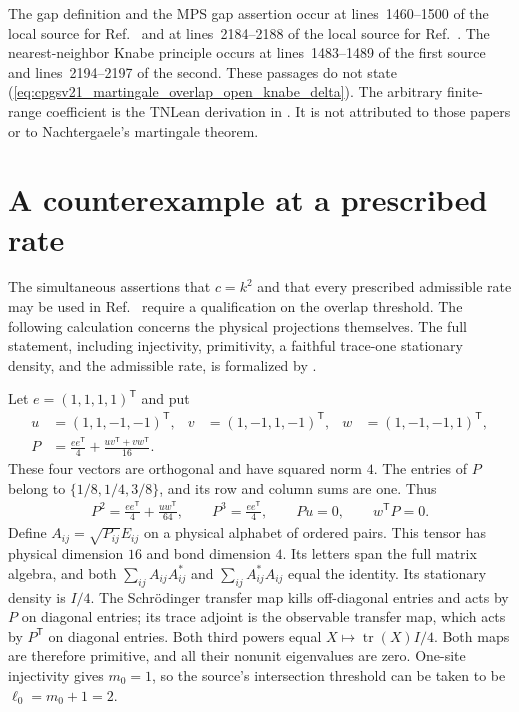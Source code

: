 \documentclass{article}
\begin{document}
The gap definition and the MPS gap assertion occur at lines~1460--1500 of the
local source for Ref.~\cite{PerezGarcia2007Matrix} and at lines~2184--2188 of
the local source for Ref.~\cite{Cirac2021Matrix}.  The nearest-neighbor Knabe
principle occurs at lines~1483--1489 of the first source and
lines~2194--2197 of the second.  These passages do not state
(\ref{eq:cpgsv21_martingale_overlap_open_knabe_delta}).  The arbitrary
finite-range coefficient is the TNLean derivation in
.  It is not
attributed to those papers or to Nachtergaele's martingale theorem.

\section{A counterexample at a prescribed rate}
\label{sec:fnw-dimension-prefactor-obstruction}

The simultaneous assertions that $c=k^2$ and that every prescribed admissible
rate may be used in Ref.~\cite[Section~6, equation~(6.1)]{Nachtergaele1996Spectral}
require a qualification on the overlap threshold. The following calculation concerns the physical projections themselves.
The full statement, including injectivity, primitivity, a faithful trace-one
stationary density, and the admissible rate, is formalized by
.

Let $e=(1,1,1,1)^{\mathsf T}$ and put
\begin{align}
    u & =(1,1,-1,-1)^{\mathsf T}, &
    v & =(1,-1,1,-1)^{\mathsf T}, &
    w & =(1,-1,-1,1)^{\mathsf T},   \\
    P & =\frac{ee^{\mathsf T}}4+
    \frac{uv^{\mathsf T}+vw^{\mathsf T}}{16}.
    \label{eq:cpgsv21_martingale_overlap_fnw_counterexample_data}
\end{align}
These four vectors are orthogonal and have squared norm $4$. The entries of
$P$ belong to $\{1/8,1/4,3/8\}$, and its row and column sums are one. Thus
\begin{align}
    P^2=\frac{ee^{\mathsf T}}4+\frac{uw^{\mathsf T}}{64},\qquad
    P^3=\frac{ee^{\mathsf T}}4,\qquad Pu=0,\qquad w^{\mathsf T}P=0.
    \label{eq:cpgsv21_martingale_overlap_fnw_counterexample_powers}
\end{align}
Define $A_{ij}=\sqrt{P_{ij}}E_{ij}$ on a physical alphabet of ordered pairs.
This tensor has physical dimension $16$ and bond dimension $4$. Its letters
span the full matrix algebra, and both $\sum_{ij}A_{ij}A_{ij}^*$ and
$\sum_{ij}A_{ij}^*A_{ij}$ equal the identity. Its stationary density is $I/4$.
The Schrödinger transfer map kills off-diagonal entries and acts by $P$ on
diagonal entries; its trace adjoint is the observable transfer map, which
acts by $P^{\mathsf T}$ on diagonal entries. Both third powers equal
$X\mapsto\operatorname{tr}(X)I/4$. Both maps are therefore primitive,
and all their nonunit eigenvalues are zero.
One-site injectivity gives $m_0=1$, so the source's intersection threshold
can be taken to be $\ell_0=m_0+1=2$.
\end{document}
